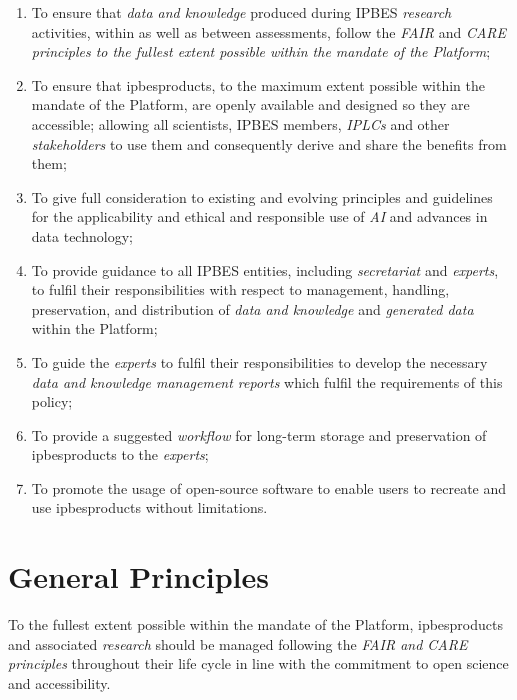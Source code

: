 \documentclass{article}
\begin{document}
\begin{enumerate}[label=(\alph*)]
    \item To ensure that \textit{data and knowledge} produced during IPBES \textit{research }activities, within as well as between assessments, follow the \textit{FAIR }and \textit{CARE principles to the fullest extent possible within the mandate of the Platform};
    
    \item To ensure that \gls{ipbesproducts}, to the maximum extent possible within the mandate of the Platform, are openly available and designed so they are accessible; allowing all scientists, IPBES members, \textit{IPLCs} and other \textit{stakeholders} to use them and consequently derive and share the benefits from them;

    \item To give full consideration to existing and evolving principles and guidelines for the applicability and
    ethical and responsible use of \textit{AI} and advances in data technology;

    \item To provide guidance to all IPBES entities, including \textit{secretariat} and \textit{experts}, to fulfil their
    responsibilities with respect to management, handling, preservation, and distribution of \textit{data and
    knowledge} and \textit{generated data} within the Platform;
    
    \item To guide the \textit{experts }to fulfil their responsibilities to develop the necessary \textit{data and knowledge management reports }which fulfil the requirements of this policy;
    
    \item To provide a suggested \textit{workflow} for long-term storage and preservation of \gls{ipbesproducts} to the \textit{experts};
    
    \item To promote the usage of open-source software to enable users to recreate and use \gls{ipbesproducts} without limitations.
\end{enumerate}


\section{General Principles}

To the fullest extent possible within the mandate of the Platform, \gls{ipbesproducts} and associated \textit{research} should be managed following the \textit{FAIR and CARE principles} throughout their life cycle in line with the commitment to open science and accessibility.
\end{document}
